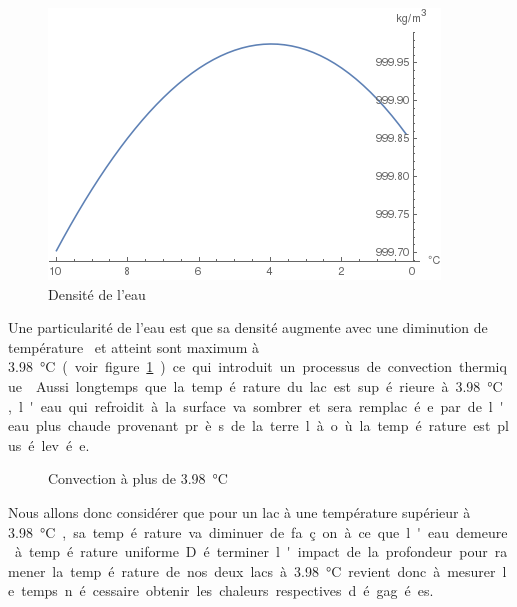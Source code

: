 \documentclass[12pt]{article}
\newcommand\critical{\SI{3.98}\celsius}
\begin{document}
\begin{figure}[h]\label{water-density}
    \centering
    \includegraphics[scale=0.9]{WaterDensity.png}
    \caption{Densit\'e de l'eau}
\end{figure}

Une particularit\'e de l'eau est que sa densit\'e augmente avec une diminution de
temp\'erature~\cite{WaterDensity} et atteint sont maximum \`a \critical (voir figure
\ref{water-density}) ce qui introduit un processus de convection thermique~\cite{ConvNat}. Aussi
longtemps que la temp\'erature du lac est sup\'erieure \`a \critical, l'eau qui refroidit \`a la
surface va sombrer et sera remplac\'ee par de l'eau plus chaude provenant pr\`es de la terre l\`a
o\`u la temp\'erature est plus \'elev\'ee.

\begin{figure}[h]\label{water-convection}
    \centering
    \caption{Convection \`a plus de \critical}
\end{figure}

Nous allons donc consid\'erer que pour un lac \`a une temp\'erature sup\'erieur \`a \critical, sa
temp\'erature va diminuer de fa\c con \`a ce que l'eau demeure \`a temp\'erature uniforme.
D\'eterminer l'impact de la profondeur pour ramener la temp\'erature de nos deux lacs \`a
\critical~revient donc \`a mesurer le temps n\'ecessaire obtenir les chaleurs respectives
d\'egag\'ees.
\end{document}
